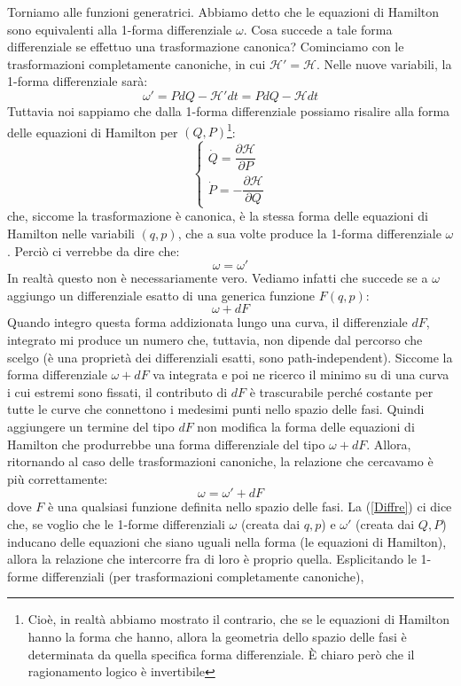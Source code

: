\documentclass[a4paper,openany]{article}
\begin{document}
	Torniamo alle funzioni generatrici. Abbiamo detto che le equazioni di Hamilton sono equivalenti alla 1-forma differenziale $\omega$. Cosa succede a tale forma differenziale se effettuo una trasformazione canonica? Cominciamo con le trasformazioni completamente canoniche, in cui $\mathcal{H}' = \mathcal{H}$. Nelle nuove variabili, la 1-forma differenziale sarà:
	$$
	\omega' = PdQ-\mathcal{H}'dt =  PdQ-\mathcal{H}dt
	$$
	Tuttavia noi sappiamo che dalla 1-forma differenziale possiamo risalire alla forma delle equazioni di Hamilton per $(Q,P)$\footnote{Cioè, in realtà abbiamo mostrato il contrario, che se le equazioni di Hamilton hanno la forma che hanno, allora la geometria dello spazio delle fasi è determinata da quella specifica forma differenziale. È chiaro però che il ragionamento logico è invertibile}:
	\begin{equation}\label{key}
		\begin{cases}
			\dot{Q} = \dfrac{\partial \mathcal{H}}{\partial P} \\
			\dot{P} = -\dfrac{\partial \mathcal{H}}{\partial Q}
		\end{cases}
	\end{equation}
	che, siccome la trasformazione è canonica, è la stessa forma delle equazioni di Hamilton nelle variabili $(q,p)$, che a sua volte produce la 1-forma differenziale $\omega$. Perciò ci verrebbe da dire che:
	$$
	\omega = \omega'
	$$
	In realtà questo non è necessariamente vero. Vediamo infatti che succede se a $\omega$ aggiungo un differenziale esatto di una generica funzione $F(q,p)$:
	$$
	\omega + dF
	$$
	Quando integro questa forma addizionata lungo una curva, il differenziale $dF$, integrato mi produce un numero che, tuttavia, non dipende dal percorso che scelgo (è una proprietà dei differenziali esatti, sono path-independent). Siccome la forma differenziale $\omega+dF$ va integrata e poi ne ricerco il minimo su di una curva i cui estremi sono fissati, il contributo di $dF$ è trascurabile perché costante per tutte le curve che connettono i medesimi punti nello spazio delle fasi. Quindi aggiungere un termine del tipo $dF$ non modifica la forma delle equazioni di Hamilton che produrrebbe una forma differenziale del tipo $\omega + dF$. Allora, ritornando al caso delle trasformazioni canoniche, la relazione che cercavamo è più correttamente:
	\begin{equation}
		\omega = \omega' + dF
		\label{Diffre}
	\end{equation}
	dove $F$ è una qualsiasi funzione definita nello spazio delle fasi. La (\ref{Diffre}) ci dice che, se voglio che le 1-forme differenziali $\omega$ (creata dai $q,p$) e $\omega'$ (creata dai $Q,P$) inducano delle equazioni che siano uguali nella forma (le equazioni di Hamilton), allora la relazione che intercorre fra di loro è proprio quella. Esplicitando le 1-forme differenziali (per trasformazioni completamente canoniche),
\end{document}
